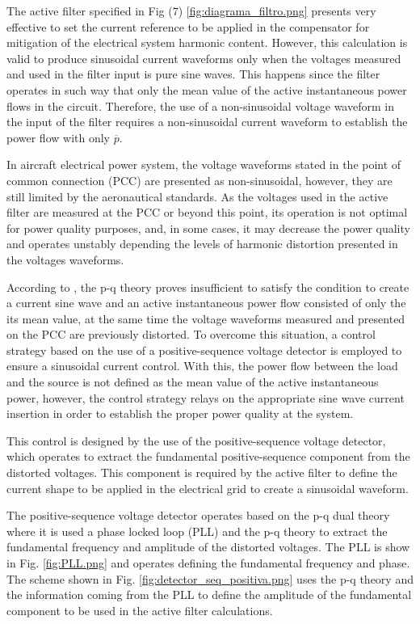 The active filter specified in Fig (7) \ref{fig:diagrama_filtro.png} presents very effective to set the current reference to be applied in the compensator for mitigation of the electrical system harmonic content. However, this calculation is valid to produce sinusoidal current waveforms only when the voltages measured and used in the filter input is pure sine waves. This happens since the filter operates in such way that only the mean value of the active instantaneous power flows in the circuit. Therefore, the use of a non-sinusoidal voltage waveform in the input of the filter requires a non-sinusoidal current waveform to establish the power flow with only $\overline{p}$.

In aircraft electrical power system, the voltage waveforms stated in the point of common connection (PCC) are presented as non-sinusoidal, however, they are still limited by the aeronautical standards. As the voltages used in the active filter are measured at the PCC or beyond this point, its operation is not optimal for power quality purposes, and, in some cases, it may decrease the power quality and operates unstably depending the levels of harmonic distortion presented in the voltages waveforms.

According to \cite{Akagi2007}, the p-q theory proves insufficient to satisfy the condition to create a current sine wave and an active instantaneous power flow consisted of only the its mean value, at the same time the voltage waveforms measured and presented on the PCC are previously distorted. To overcome this situation, a control strategy based on the use of a positive-sequence voltage detector is employed to ensure a sinusoidal current control. With this, the power flow between the load and the source is not defined as the mean value of the active instantaneous power, however, the control strategy relays on the appropriate sine wave current insertion in order to establish the proper power quality at the system.

This control is designed by the use of the positive-sequence voltage detector, which operates to extract the fundamental positive-sequence component from the distorted voltages. This component is required by the active filter to define the current shape to be applied in the electrical grid to create a sinusoidal waveform.

The positive-sequence voltage detector operates based on the p-q dual theory where it is used a phase locked loop (PLL) and the p-q theory to extract the fundamental frequency and amplitude of the distorted voltages. The PLL is show in Fig. \ref{fig:PLL.png} and operates defining the fundamental frequency and phase. The scheme shown in Fig. \ref{fig:detector_seq_positiva.png} uses the p-q theory and the information coming from the PLL to define the amplitude of the fundamental component to be used in the active filter calculations.

